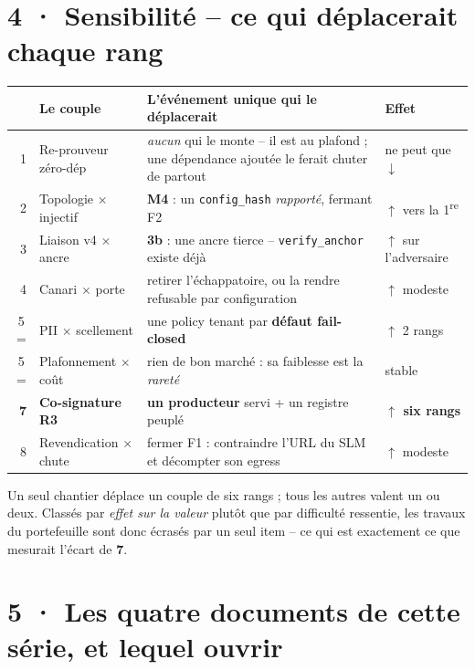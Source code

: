 \documentclass[10pt]{article}
\newcommand{\best}[1]{{\color{green}\textbf{#1}}}
\newcommand{\pire}[1]{{\color{red}\textbf{#1}}}
\newcommand{\sz}[1]{{\small\color{grey}\textsf{#1}}}
\newcommand{\code}[1]{\texttt{\small #1}}
\newcommand{\x}{$\times$}
\begin{document}
\section{4 · Sensibilité -- ce qui déplacerait chaque rang}

\renewcommand{\arraystretch}{1.2}
\begin{center}\small
\begin{tabular}{@{}r >{\raggedright\arraybackslash}p{4.3cm} >{\raggedright\arraybackslash}p{7.4cm} >{\raggedright\arraybackslash}p{3.4cm}@{}}
\toprule
& \textbf{Le couple} & \textbf{L'événement unique qui le déplacerait} & \textbf{Effet} \\
\midrule
1 & Re-prouveur zéro-dép & \emph{aucun} qui le monte -- il est au plafond ; une dépendance ajoutée le
  ferait chuter de partout & \sz{ne peut que} $\downarrow$ \\
2 & Topologie \x{} injectif & \textbf{M4} : un \code{config\_hash} \emph{rapporté}, fermant F2 &
  $\uparrow$ \sz{vers la 1\textsuperscript{re}} \\
3 & Liaison v4 \x{} ancre & \textbf{3b} : une ancre tierce -- \code{verify\_anchor} existe déjà &
  $\uparrow$ \sz{sur l'adversaire} \\
4 & Canari \x{} porte & retirer l'échappatoire, ou la rendre refusable par configuration &
  $\uparrow$ \sz{modeste} \\
5\,= & PII \x{} scellement & une policy tenant par \textbf{défaut fail-closed} & $\uparrow$ \sz{2 rangs} \\
5\,= & Plafonnement \x{} coût & rien de bon marché : sa faiblesse est la \emph{rareté} & \sz{stable} \\
\textbf{7} & \textbf{Co-signature R3} & \textbf{un producteur} servi + un registre peuplé &
  \best{$\uparrow$ six rangs} \\
8 & Revendication \x{} chute & fermer F1 : contraindre l'URL du SLM et décompter son egress &
  $\uparrow$ \sz{modeste} \\
\bottomrule
\end{tabular}
\end{center}

Un seul chantier déplace un couple de six rangs ; tous les autres valent un ou deux. Classés par
\emph{effet sur la valeur} plutôt que par difficulté ressentie, les travaux du portefeuille sont donc
écrasés par un seul item -- ce qui est exactement ce que mesurait l'écart de \pire{7}.

\section{5 · Les quatre documents de cette série, et lequel ouvrir}
\end{document}
